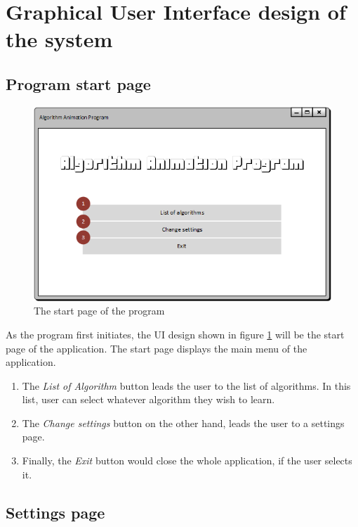 \newpage

\section{Graphical User Interface design of the system} \label{uiDesign}
\subsection{Program start page}

\begin{figure}[H]
\centering
\includegraphics[scale=1]{images/report_images/uiStartWindow.png}
\caption{The start page of the program}
\label{uiStartWindow}
\end{figure}

As the program first initiates, the UI design shown in figure \ref{uiStartWindow} will be the start page of the application. The start page displays the main menu of the application. 

\begin{enumerate}
\item The \textit{List of Algorithm} button leads the user to the list of algorithms. In this list, user can select whatever algorithm they wish to learn. 
\item The \textit{Change settings} button on the other hand, leads the user to a settings page.
\item Finally, the \textit{Exit} button would close the whole application, if the user selects it.
\end{enumerate}

\subsection{Settings page}

